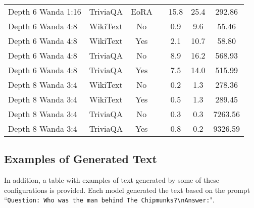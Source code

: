 \begin{longtable}{lcclccc}
Depth 6 Wanda 1:16 & TriviaQA & EoRA & & 15.8 & 25.4 & 292.86 \\
Depth 6 Wanda 4:8 & WikiText & No & & 0.9 & 9.6 & 55.46 \\
Depth 6 Wanda 4:8 & WikiText & Yes & & 2.1 & 10.7 & 58.80 \\
Depth 6 Wanda 4:8 & TriviaQA & No & & 8.9 & 16.2 & 568.93 \\
Depth 6 Wanda 4:8 & TriviaQA & Yes & & 7.5 & 14.0 & 515.99 \\
Depth 8 Wanda 3:4 & WikiText & No & & 0.2 & 1.3 & 278.36 \\
Depth 8 Wanda 3:4 & WikiText & Yes & & 0.5 & 1.3 & 289.45 \\
Depth 8 Wanda 3:4 & TriviaQA & No & & 0.3 & 0.3 & 7263.56 \\
Depth 8 Wanda 3:4 & TriviaQA & Yes & & 0.8 & 0.2 & 9326.59 \\

\end{longtable}
\normalsize

\subsection{Examples of Generated Text}
In addition, a table with examples of text generated by some of these configurations is provided. Each model generated the text based on the prompt ``\texttt{Question: Who was the man behind The Chipmunks?\textbackslash nAnswer:}".

